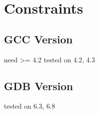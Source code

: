 \section{Constraints}

\subsection{GCC Version}
need >= 4.2
tested on 4.2, 4.3

\subsection{GDB Version}
tested on 6.3, 6.8

